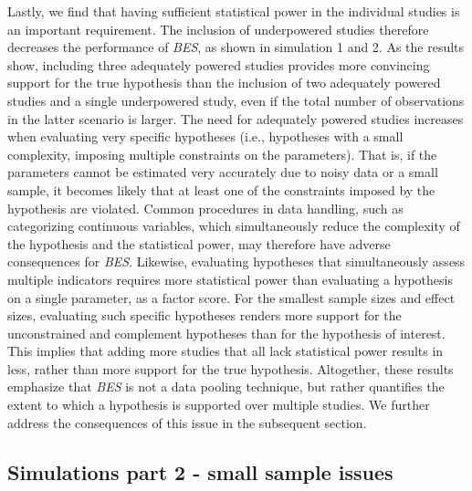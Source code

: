 \documentclass[review, 3p, authoryear]{elsarticle} %
\begin{document}
Lastly, we find that having sufficient statistical power in the individual studies is an important requirement.
The inclusion of underpowered studies therefore decreases the performance of \emph{BES}, as shown in simulation 1 and 2.
As the results show, including three adequately powered studies provides more convincing support for the true hypothesis than the inclusion of two adequately powered studies and a single underpowered study, even if the total number of observations in the latter scenario is larger.
The need for adequately powered studies increases when evaluating very specific hypotheses (i.e., hypotheses with a small complexity, imposing multiple constraints on the parameters).
That is, if the parameters cannot be estimated very accurately due to noisy data or a small sample, it becomes likely that at least one of the constraints imposed by the hypothesis are violated.
Common procedures in data handling, such as categorizing continuous variables, which simultaneously reduce the complexity of the hypothesis and the statistical power, may therefore have adverse consequences for \emph{BES}.
Likewise, evaluating hypotheses that simultaneously assess multiple indicators requires more statistical power than evaluating a hypothesis on a single parameter, as a factor score.
For the smallest sample sizes and effect sizes, evaluating such specific hypotheses renders more support for the unconstrained and complement hypotheses than for the hypothesis of interest.
This implies that adding more studies that all lack statistical power results in less, rather than more support for the true hypothesis.
Altogether, these results emphasize that \emph{BES} is not a data pooling technique, but rather quantifies the extent to which a hypothesis is supported over multiple studies.
We further address the consequences of this issue in the subsequent section.

\hypertarget{simulations-part-2---small-sample-issues}{%
\subsection{Simulations part 2 - small sample issues}\label{simulations-part-2---small-sample-issues}}
\end{document}
